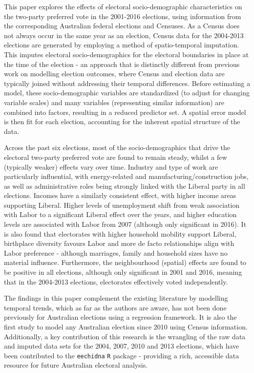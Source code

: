 \documentclass[11pt,a4paper,]{article}
\begin{document}
This paper explores the effects of electoral socio-demographic characteristics on the two-party preferred vote in the 2001-2016 elections, using information from the corresponding Australian federal elections and Censuses. As a Census does not always occur in the same year as an election, Census data for the 2004-2013 elections are generated by employing a method of spatio-temporal imputation. This imputes electoral socio-demographics for the electoral boundaries in place at the time of the election - an approach that is distinctly different from previous work on modelling election outcomes, where Census and election data are typically joined without addressing their temporal differences. Before estimating a model, these socio-demographic variables are standardized (to adjust for changing variable scales) and many variables (representing similar information) are combined into factors, resulting in a reduced predictor set. A spatial error model is then fit for each election, accounting for the inherent spatial structure of the data.

Across the past six elections, most of the socio-demographics that drive the electoral two-party preferred vote are found to remain steady, whilst a few (typically weaker) effects vary over time. Industry and type of work are particularly influential, with energy-related and manufacturing/construction jobs, as well as administrative roles being strongly linked with the Liberal party in all elections. Incomes have a similarly consistent effect, with higher income areas supporting Liberal. Higher levels of unemployment shift from weak association with Labor to a significant Liberal effect over the years, and higher education levels are associated with Labor from 2007 (although only significant in 2016). It is also found that electorates with higher household mobility support Liberal, birthplace diversity favours Labor and more de facto relationships align with Labor preference - although marriages, family and household sizes have no material influence. Furthermore, the neighbourhood (spatial) effects are found to be positive in all elections, although only significant in 2001 and 2016, meaning that in the 2004-2013 elections, electorates effectively voted independently.

The findings in this paper complement the existing literature by modelling temporal trends, which as far as the authors are aware, has not been done previously for Australian elections using a regression framework. It is also the first study to model any Australian election since 2010 using Census information. Additionally, a key contribution of this research is the wrangling of the raw data and imputed data sets for the 2004, 2007, 2010 and 2013 elections, which have been contributed to the \texttt{eechidna} \texttt{R} package - providing a rich, accessible data resource for future Australian electoral analysis.
\end{document}
